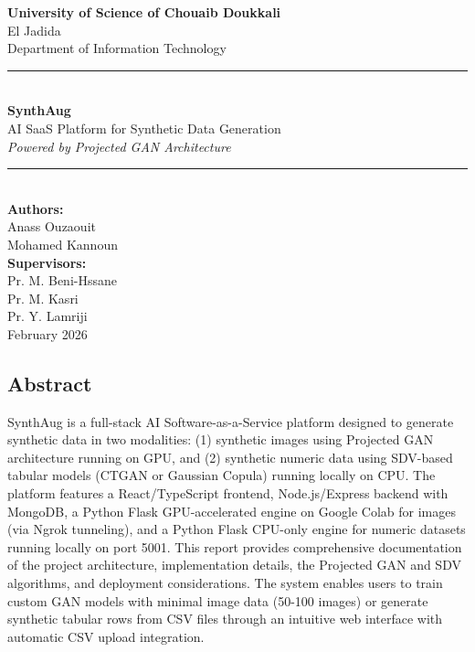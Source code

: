 \documentclass[11pt,a4paper]{article}
\begin{document}
\begin{titlepage}
    \centering
    \vspace*{1cm}
    
    {\Large \textbf{University of Science of Chouaib Doukkali}}\\[0.2cm]
    {\large El Jadida}\\[0.3cm]
    {\large Department of Information Technology}\\[2cm]
    
    \rule{\textwidth}{1pt}\\[2cm]
    
    {\Huge \textbf{SynthAug}}\\[0.5cm]
    {\Large AI SaaS Platform for Synthetic Data Generation}\\[0.2cm]
    {\large \textit{Powered by Projected GAN Architecture}}\\[3cm]
    
    \rule{\textwidth}{1pt}\\[2cm]
    
    {\large \textbf{Authors:}}\\[0.3cm]
    {\normalsize Anass Ouzaouit}\\
    {\normalsize Mohamed Kannoun}\\[1.5cm]
    
    {\large \textbf{Supervisors:}}\\[0.3cm]
    {\normalsize Pr. M. Beni-Hssane}\\
    {\normalsize Pr. M. Kasri}\\
    {\normalsize Pr. Y. Lamriji}\\[2cm]
    
    \vfill
    {\normalsize February 2026}
\end{titlepage}

\newpage

\begin{center}
    \section*{Abstract}
\end{center}

\noindent
SynthAug is a full-stack AI Software-as-a-Service platform designed to generate synthetic data in two modalities: (1) synthetic images using Projected GAN architecture running on GPU, and (2) synthetic numeric data using SDV-based tabular models (CTGAN or Gaussian Copula) running locally on CPU. The platform features a React/TypeScript frontend, Node.js/Express backend with MongoDB, a Python Flask GPU-accelerated engine on Google Colab for images (via Ngrok tunneling), and a Python Flask CPU-only engine for numeric datasets running locally on port 5001. This report provides comprehensive documentation of the project architecture, implementation details, the Projected GAN and SDV algorithms, and deployment considerations. The system enables users to train custom GAN models with minimal image data (50-100 images) or generate synthetic tabular rows from CSV files through an intuitive web interface with automatic CSV upload integration.
\end{document}
